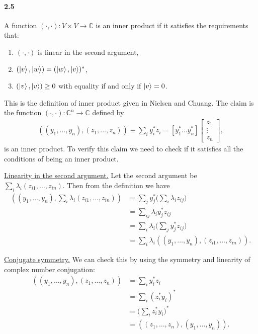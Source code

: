 \paragraph{2.5}

A function \((\cdot, \cdot): V \times V \rightarrow \mathbb{C}\) is an inner
product if it satisfies the requirements that:
\begin{enumerate}
\item \((\cdot, \cdot)\) is linear in the second argument,
\item \((\ket{v}, \ket{w}) = (\ket{w}, \ket{v})^*\),
\item \((\ket{v}, \ket{v}) \ge 0\) with equality if and only if \(\ket{v} = 0\).
\end{enumerate}
This is the definition of inner product given in Nielsen and Chuang. The claim
is the function \((\cdot, \cdot): \mathbb{C}^n \rightarrow \mathbb{C}\) defined
by
\begin{align}
  \label{eq:complex-multiplication}
  ((y_1, \ldots, y_n), (z_1, \ldots, z_n))
  \equiv
  \sum_{i} y_i^*z_i = [y_1^* \ldots y_n^*]
  \begin{bmatrix}
    z_1 \\ \vdots \\ z_n
  \end{bmatrix},
\end{align}
is an inner product. To verify this claim we need to check if it satisfies all
the conditions of being an inner product.

\underline{Linearity in the second argument.} Let the second argument be
\(\sum_i \lambda_i (z_{i1},\ldots,z_{in})\). Then from the definition we have
\begin{align}
  \label{eq:linearity-check}
  ((y_1, \ldots, y_n), \sum_i \lambda_i (z_{i1},\ldots,z_{in}))
  &= \sum_{j} y_j^* \biggl(\sum_i \lambda_i z_{ij}\biggr) \nonumber\\
  &= \sum_{ij} \lambda_i y_j^*z_{ij} \nonumber\\
  &= \sum_{i} \lambda_i \biggl(\sum_j y_j^*z_{ij}\biggr) \nonumber\\
  &= \sum_{i} \lambda_i((y_1, \ldots, y_n), (z_{i1}, \ldots, z_{in})).
\end{align}

\underline{Conjugate symmetry.} We can check this by using the symmetry and
linearity of complex number conjugation:
\begin{align}
  \label{eq:conjugate-symmetry-check}
  ((y_1, \ldots, y_n), (z_1, \ldots, z_n))
  &= \sum_{i}y_i^*z_i \nonumber\\
  &= \sum_{i}(z_i^*y_i)^* \nonumber\\
  &= \biggl(\sum_{i}z_i^*y_i\biggr)^* \nonumber\\
  &= ((z_1, \ldots, z_n), (y_1, \ldots, y_n)).
\end{align}

